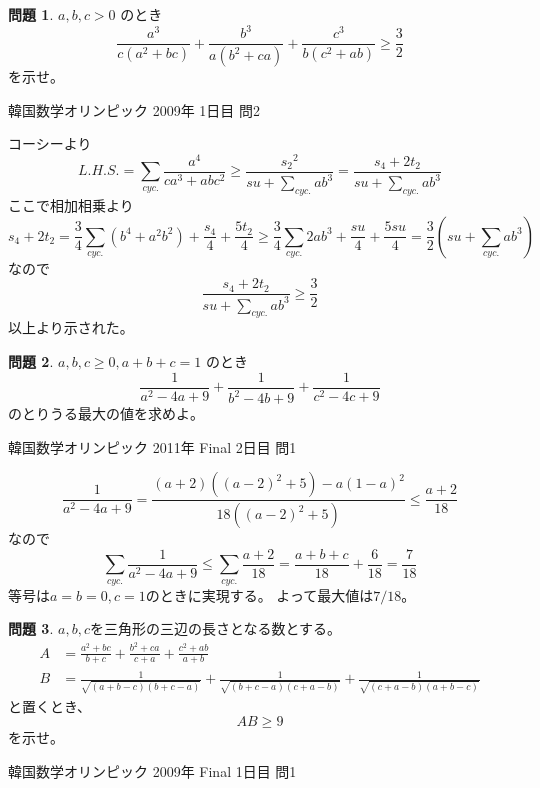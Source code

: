 \documentclass[uplatex, a5paper]{jsarticle}
\makeatletter
\theoremstyle{definition}
\newtheorem{prob}{問題}
\renewenvironment{proof}[1][\proofname]{
  \pushQED{\qed}%
  \normalfont \topsep6\p@\@plus6\p@\relax
  \trivlist
  \item[\hskip\labelsep
    #1\@addpunct{\textbf{.}}]\ignorespaces
}{%
  \popQED\endtrivlist\@endpefalse
}
\providecommand{\proofname}{証明}
\newcommand{\lhs }{ L.H.S. }
\def\qed{\hfill $\Box$}
\makeatother
\begin{document}
\newpage


\begin{prob}
  \(a,b,c > 0\)
  のとき
  \[
  \frac{a^3}{c(a^2+bc)} + \frac{b^3}{a(b^2+ca)} + \frac{c^3}{b(c^2+ab)} \geq \frac{3}{2}
  \]
  を示せ。
  \begin{flushright}
    韓国数学オリンピック 2009年 1日目 問2
  \end{flushright}
\end{prob}


\begin{proof}
  コーシーより
  \[
  \lhs = \sum_{cyc.} \frac{a^4}{ca^3+abc^2}
  \geq \frac{{s_2}^2}{su + \sum_{cyc.}ab^3}
  = \frac{s_4+2t_2}{su+\sum_{cyc.}ab^3}
  \]
  ここで相加相乗より
  \[
  s_4+2t_2
  = \frac{3}{4}\sum_{cyc.}(b^4 + a^2b^2) + \frac{s_4}{4} + \frac{5t_2}{4}
  \geq \frac{3}{4}\sum_{cyc.}2ab^3 + \frac{su}{4} + \frac{5su}{4}
  = \frac{3}{2}\left( su + \sum_{cyc.}ab^3 \right)
  \]
  なので
  \[
  \frac{s_4+2t_2}{su+\sum_{cyc.}ab^3} \geq \frac{3}{2}
  \]
  以上より示された。
\end{proof}











\newpage

\begin{prob}
  \(a,b,c \geq 0 , a+b+c=1 \)
  のとき
  \[
  \frac{1}{a^2-4a+9} + \frac{1}{b^2-4b+9} + \frac{1}{c^2-4c+9}
  \]
  のとりうる最大の値を求めよ。
  \begin{flushright}
    韓国数学オリンピック 2011年 Final 2日目 問1
  \end{flushright}
\end{prob}


\begin{proof}
  \[
  \frac{1}{a^2-4a+9}
  = \frac{(a+2)\left( (a-2)^2 + 5 \right) -a(1-a)^2 }{18\left( (a-2)^2 + 5 \right) }
  \leq \frac{a+2}{18}
  \]
  なので
  \[
  \sum_{cyc.} \frac{1}{a^2-4a+9}
  \leq \sum_{cyc.} \frac{a+2}{18}
  = \frac{a+b+c}{18}+\frac{6}{18} = \frac{7}{18}
  \]
  等号は\(a=b=0,c=1\)のときに実現する。
  よって最大値は\(7/18\)。
\end{proof}








\newpage

\begin{prob}
  \(a,b,c\)を三角形の三辺の長さとなる数とする。
  \begin{align*}
    A &= \frac{a^2+bc}{b+c} + \frac{b^2+ca}{c+a} + \frac{c^2+ab}{a+b} \\
    B &= \frac{1}{\sqrt{(a+b-c)(b+c-a)}} + \frac{1}{\sqrt{(b+c-a)(c+a-b)}} + \frac{1}{\sqrt{(c+a-b)(a+b-c)}}
  \end{align*}
  と置くとき、
  \[
  AB\geq 9
  \]
  を示せ。
  \begin{flushright}
    韓国数学オリンピック 2009年 Final 1日目 問1
  \end{flushright}
\end{prob}
\end{document}
